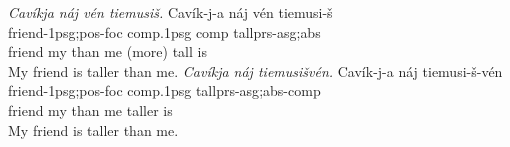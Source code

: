 \documentclass[grammar]{subfiles}
\begin{document}

  \newpage
  \begin{exe}
    \ex\label{exe:am_degree} 
    \begin{xlist}
      \ex \textit{Cavíkja náj vén tiemusiš.}
      \glll Cavík-j-a náj vén tiemusi-š\\
      friend-\acs{1p}\acs{sg};\acs{pos}-\acs{foc} \acs{comp}.\acs{1p}\acs{sg} \acs{comp} tall\bs\acs{prs}-\acs{asg};\acs{abs}\\
      {friend my} {than me} {(more)} {tall is}\\
      \glt My friend is taller than me.
      \ex \textit{Cavíkja náj tiemusišvén.}
      \glll Cavík-j-a náj tiemusi-š-vén\\
      friend-\acs{1p}\acs{sg};\acs{pos}-\acs{foc} \acs{comp}.\acs{1p}\acs{sg} tall\bs \acs{prs}-\acs{asg};\acs{abs}-\acs{comp}\\
      {friend my} {than me} {taller is}\\
      \glt My friend is taller than me.
    \end{xlist}
  \end{exe}
\end{document}
